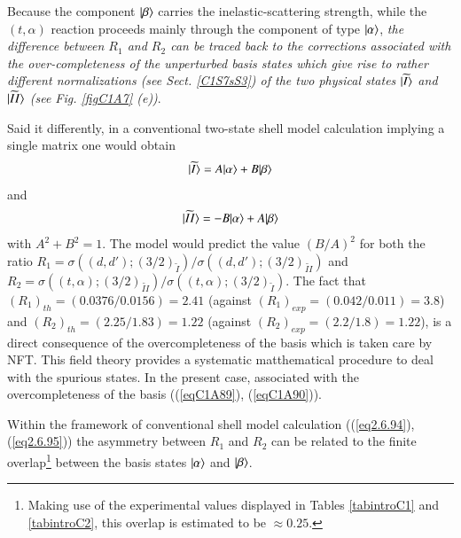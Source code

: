  Because the component $|{\beta} \rangle$ carries the inelastic-scattering strength, while the $(t,\alpha)$ reaction proceeds mainly through the component of type $|{\alpha} \rangle$, \textit{the difference between $R_1$ and $R_2$ can be traced back to the corrections associated with the over-completeness of the unperturbed basis states which give rise to rather different normalizations (see Sect. \ref{C1S7sS3}) of the two physical states $|{\widetilde I} \rangle$ and $|{\widetilde {II}} \rangle$ (see Fig. \ref{figC1A7} (e))}. 


Said it differently, in a conventional two-state shell model calculation implying a single matrix one would obtain
  \begin{align}\label{eq2.6.94} 
|{\widetilde I} \rangle=A|{\alpha} \rangle+B|{\beta} \rangle
\end{align} 
and
  \begin{align}\label{eq2.6.95} 
|{\widetilde {II}} \rangle=-B|{\alpha} \rangle+A|{\beta} \rangle
\end{align} 
with $A^2+B^2=1$. The model would predict the value $(B/A)^2$ for both the ratio $R_1=\sigma((d,d');(3/2)_{\widetilde I})/\sigma((d,d');(3/2)_{\widetilde {II}})$ and $R_2=\sigma((t,\alpha);(3/2)_{\widetilde {II}})/\sigma((t,\alpha);(3/2)_{\widetilde {I}})$. The fact that $(R_1)_{th}=(0.0376/0.0156)=2.41$ (against $(R_1)_{exp}=(0.042/0.011)=3.8$) and $(R_2)_{th}=(2.25/1.83)=1.22$ (against $(R_2)_{exp}=(2.2/1.8)=1.22$), is a direct consequence of the overcompleteness of the basis which is taken care by NFT. This field theory provides a systematic matthematical procedure to deal with the spurious states. In the present case, associated with the overcompleteness of the basis ((\ref{eqC1A89}), (\ref{eqC1A90})).

Within the framework of conventional shell model calculation ((\ref{eq2.6.94}), (\ref{eq2.6.95})) the asymmetry between $R_1$ and $R_2$ can be related to the finite overlap\footnote{Making use of the experimental values displayed in Tables \ref{tabintroC1} and  \ref{tabintroC2}, this overlap is estimated to be $\approx0.25$.} between the basis states $|{\alpha} \rangle$ and $|{\beta} \rangle$.


